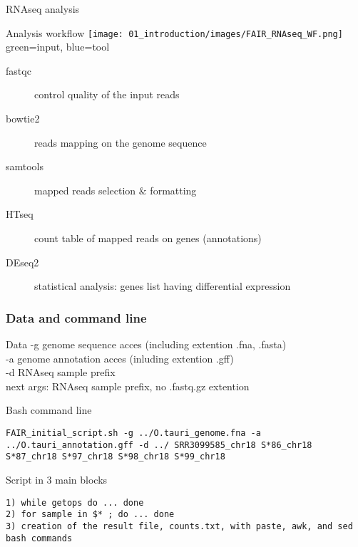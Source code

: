 \begin{frame}{RNAseq analysis}
\begin{block}{Analysis workflow}
    \texttt{[image: 01\_introduction/images/FAIR\_RNAseq\_WF.png]}\\
green=input, blue=tool
\end{block}
\footnotesize{
\begin{description}
    \item[fastqc] control quality of the input reads
    \item[bowtie2] reads mapping on the genome sequence
    \item[samtools] mapped reads selection $\&$ formatting
    \item[HTseq] count table of mapped reads on genes (annotations)
    \item[DEseq2] statistical analysis: genes list having differential expression
\end{description}
}
\end{frame}
\begin{frame}[containsverbatim]
\frametitle{Data and command line}
\begin{exampleblock}{Data}
-g genome sequence acces (including extention .fna, .fasta)\\
-a genome annotation acces (inluding extention .gff)\\
-d RNAseq sample prefix\\
next args: RNAseq sample prefix, no .fastq.gz extention
\end{exampleblock}
\begin{exampleblock}{Bash command line}
\begin{lstlisting}
FAIR_initial_script.sh -g ../O.tauri_genome.fna -a ../O.tauri_annotation.gff -d ../ SRR3099585_chr18 S*86_chr18 S*87_chr18 S*97_chr18 S*98_chr18 S*99_chr18
\end{lstlisting}
\end{exampleblock}
\begin{exampleblock}{Script in 3 main blocks}
\begin{lstlisting}
1) while getops do ... done   
2) for sample in $* ; do ... done   
3) creation of the result file, counts.txt, with paste, awk, and sed bash commands
\end{lstlisting}
\end{exampleblock}
\end{frame}
